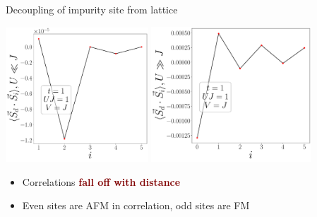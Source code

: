 \documentclass[aspectratio=169]{beamer}
\newcommand{\focus}[1]{\textcolor{maroon}{\textbf{#1}}}
\begin{document}
\begin{frame}[noframenumbering]{Decoupling of impurity site from lattice}
{\vspace{20pt}
\begin{center}
\includegraphics[width=0.4\textwidth]{figures/corr-di-min-t=1.000,J=1_over_U,V=J,N=6,U=0.010,100.000,100.pdf}
\hspace*{\fill}
\includegraphics[width=0.45\textwidth]{figures/corr-di-max-t=1.000,J=1_over_U,V=J,N=6,U=0.010,100.000,100.pdf}
\hspace*{\fill}
\end{center}
\vspace{-10pt}
\begin{itemize}
	\item Correlations \focus{fall off with distance}
	\item Even sites are AFM in correlation, odd sites are FM
\end{itemize}
}
\end{frame}
\end{document}
